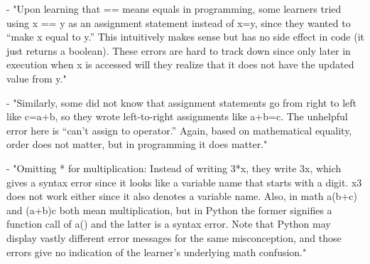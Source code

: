 - "Upon learning that == means equals in programming, some learners tried 
using x == y as an assignment statement instead of x=y, since they wanted to 
“make x equal to y.” This intuitively makes sense but has no side effect in 
code (it just returns a boolean). These errors are hard to track down since 
only later in execution when x is accessed will they realize that it does not 
have the updated value from y." \parencite{GuoMarkelZhang2020}

- "Similarly, some did not know that assignment statements go from right to 
left like c=a+b, so they wrote left-to-right assignments like a+b=c. The 
unhelpful error here is “can’t assign to operator.” Again, based on 
mathematical equality, order does not matter, but in programming it does 
matter." \parencite{GuoMarkelZhang2020}

- "Omitting * for multiplication: Instead of writing 3*x, they write 3x, 
which gives a syntax error since it looks like a variable name that starts 
with a digit. x3 does not work either since it also denotes a variable name. 
Also, in math a(b+c) and (a+b)c both mean multiplication, but in Python the 
former signifies a function call of a() and the latter is a syntax error. 
Note that Python may display vastly different error messages for the same 
misconception, and those errors give no indication of the learner’s 
underlying math confusion." \parencite{GuoMarkelZhang2020}

